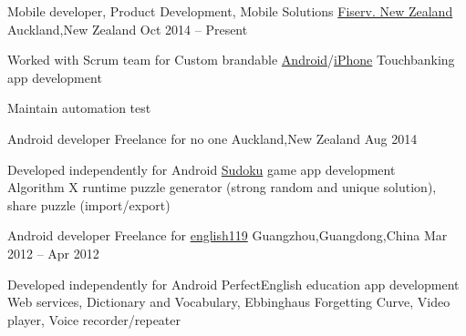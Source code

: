 
\begin{cventries}
	\cventry
	{Mobile developer, Product Development, Mobile Solutions}
	{\href{https://www.careers.fiserv.com/new-zealand}{Fiserv. New Zealand}}
	{Auckland,\enskip New Zealand}
	{Oct 2014 – Present}
	{
		\begin{cvitems}
			\item {Worked with Scrum team for Custom brandable \href{https://play.google.com/store/apps/details?id=com.fiserv.touchbankingasp&hl=en}{Android}/\href{https://itunes.apple.com/us/app/touchbanking/id386678211?mt=8}{iPhone} Touchbanking app development}
			\item {Maintain automation test}
		\end{cvitems}
	}
\end{cventries}

\begin{cventries}
	\cventry
	{Android developer}
	{Freelance for no one}
	{Auckland,\enskip New Zealand}
	{Aug 2014}
	{
		\begin{cvitems}
			\item {Developed independently for Android \href{https://play.google.com/store/apps/details?id=com.gmail.jiangyang5157.sudoku}{Sudoku} game app development\\
			Algorithm X runtime puzzle generator (strong random and unique solution), share puzzle (import/export)}
		\end{cvitems}
	}
\end{cventries}

\begin{cventries}
	\cventry
	{Android developer}
	{Freelance for \href{http://www.english119.cn}{english119}}
	{Guangzhou,\enskip Guangdong,\enskip China}
	{Mar 2012 – Apr 2012}
	{
		\begin{cvitems}
			\item {Developed independently for Android PerfectEnglish education app development\\
				Web services, Dictionary and Vocabulary, Ebbinghaus Forgetting Curve, Video player, Voice recorder/repeater}
		\end{cvitems}
	}
\end{cventries}

